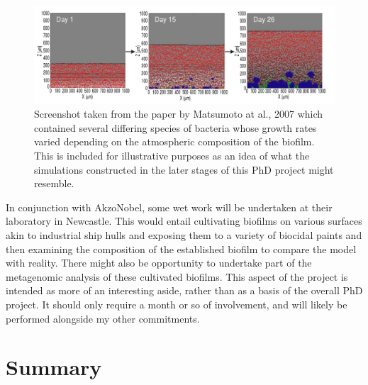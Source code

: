 \documentclass[a4paper,12pt]{article}
\begin{document}
\begin{figure}[H]
 \centering
 \includegraphics[width=16.4cm]{Matsumoto-biofilm-simulation}
 \caption{Screenshot taken from the paper by Matsumoto at al., 2007 \cite{bioref:Matsumoto-sim-snapshot-2007} which contained several differing species of bacteria whose growth rates 
 varied depending on the atmospheric composition of the biofilm.  This is included for illustrative purposes as an idea of what the simulations constructed in the later 
 stages of this PhD project might resemble.}
 \label{fig:Greulich-time-til-resistance}
\end{figure}

In conjunction with AkzoNobel, some wet work will be undertaken at their laboratory in Newcastle.  This would entail cultivating biofilms on various surfaces akin to industrial 
ship hulls and exposing them to a variety of biocidal paints and then examining the composition of the established biofilm to compare the model with reality.  There might also 
be opportunity to undertake part of the metagenomic analysis of these cultivated biofilms.  This aspect of the project is intended as more of an interesting aside, rather than 
as a basis of the overall PhD project.  It should only require a month or so of involvement, and will likely be performed alongside my other commitments. 

% 
% 
 
\section{Summary}
\end{document}
